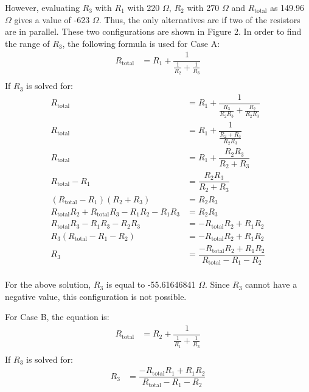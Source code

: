 \documentclass [12pt, letterpaper, twoside] {article}
\begin{document}
However, evaluating \(R_{3}\) with \(R_{1}\) with 220 \(\Omega\), \(R_{2}\) with 270 \(\Omega\) and \(R_{\text{total}}\) as 149.96 \(\Omega\) gives a value of -623 \(\Omega\). Thus, the only alternatives are if two of the resistors are in parallel. These two configurations are shown in Figure 2. In order to find the range of \(R_{3}\), the following formula is used for Case A:
\begin{equation*}
  \begin{split}
    R_{\text{total}} &= R_{1} + \dfrac{1}{\tfrac{1}{R_{2}} + \tfrac{1}{R_{3}}} \\
  \end{split}
\end{equation*}
If \(R_{3}\) is solved for:
\begin{equation*}
  \begin{split}
    R_{\text{total}} &= R_{1} + \dfrac{1}{\tfrac{R_{3}}{R_{2}R_{3}} + \tfrac{R_{2}}{R_{2}R_{3}}} \\
    R_{\text{total}} &= R_{1} + \dfrac{1}{\tfrac{R_{2} + R_{3}}{R_{2}R_{3}}} \\
    R_{\text{total}} &= R_{1} + \dfrac{R_{2}R_{3}}{R_{2} + R_{3}} \\
    R_{\text{total}} - R_{1} &= \dfrac{R_{2}R_{3}}{R_{2} + R_{3}} \\
    (R_{\text{total}} - R_{1})(R_{2} + R_{3} ) &= R_{2}R_{3} \\
    R_{\text{total}}R_{2} + R_{\text{total}}R_{3} - R_{1}R_{2} - R_{1}R_{3} &= R_{2}R_{3} \\
    R_{\text{total}}R_{3} -R_{1}R_{3} - R_{2}R_{3} &= -R_{\text{total}}R_{2} + R_{1}R_{2} \\
    R_{3}(R_{\text{total}} - R_{1} - R_{2}) &=  -R_{\text{total}}R_{2} + R_{1}R_{2} \\
    R_{3} &= \dfrac{-R_{\text{total}}R_{2} + R_{1}R_{2}}{R_{\text{total}} - R_{1} - R_{2}} \\
  \end{split}
\end{equation*}

\noindent
For the above solution, \(R_{3}\) is equal to -55.61646841 \(\Omega\). Since \(R_{3}\) cannot have a negative value, this configuration is not possible.

\noindent
For Case B, the equation is:
\begin{equation*}
  \begin{split}
    R_{\text{total}} &= R_{2} + \dfrac{1}{\tfrac{1}{R_{1}} + \tfrac{1}{R_3}} \\
  \end{split}
\end{equation*}
If \(R_{3}\) is solved for:
\begin{equation*}
  \begin{split}
    R_{3} &= \dfrac{-R_{\text{total}}R_{1} + R_{1}R_{2}}{R_{\text{total}} - R_{1} - R_{2}} \\
  \end{split}
\end{equation*}
\end{document}

